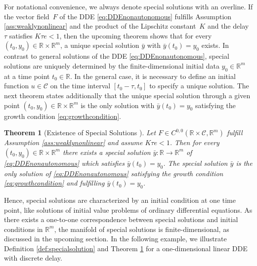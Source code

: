 \documentclass[10pt]{article}
\numberwithin{equation}{section}
\newtheorem{theorem}{Theorem}[section]
\begin{document}
	For notational convenience, we always denote special solutions with an overline. If the vector field~$F$ of the DDE \eqref{eq:DDEnonautonomous} fulfills Assumption \ref{ass:weaklynonlinear} and the product of the Lipschitz constant~$K$ and the delay $\tau$ satisfies $K\tau e < 1$, then the upcoming theorem shows that for every $(t_0,y_0)\in\mathbb{R}\times \mathbb{R}^m$, a unique special solution $\bar{y}$ with $\bar{y}(t_0) = y_0$ exists. In contrast to general solutions of the DDE \eqref{eq:DDEnonautonomous}, special solutions are uniquely determined by the finite-dimensional initial data $y_0 \in \mathbb{R}^m$ at a time point $t_0 \in \mathbb{R}$. In the general case, it is necessary to define an initial function $u\in \mathcal{C}$ on the time interval $[t_0-\tau,t_0]$ to specify a unique solution. The next theorem states additionally that the unique special solution through a given point $(t_0,y_0)\in\mathbb{R}\times \mathbb{R}^m$ is the only solution with $\bar{y}(t_0) = y_0$ satisfying the growth condition \eqref{eq:growthcondition}.
	
	
	\begin{theorem}[Existence of Special Solutions \cite{Driver1968}]\label{th:specialsolutions_uniqueness} 
		Let  $F\in C^{0,0}(\mathbb{R}\times \mathcal{C}, \mathbb{R}^m)$ fulfill Assumption \ref{ass:weaklynonlinear} and assume $K \tau e < 1$. Then for every $(t_0,y_0)\in\mathbb{R}\times \mathbb{R}^m$ there exists a special solution $\bar{y}:\mathbb{R}\rightarrow \mathbb{R}^m$ of \eqref{eq:DDEnonautonomous} which satisfies $\bar{y}(t_0) = y_0$. The special solution $\bar{y}$ is the only solution of \eqref{eq:DDEnonautonomous} satisfying the growth condition \eqref{eq:growthcondition} and fulfilling $\bar{y}(t_0) = y_0$.
	\end{theorem}
	
	Hence, special solutions are characterized by an initial condition at one time point, like solutions of initial value problems of ordinary differential equations. As there exists a one-to-one correspondence between special solutions and initial conditions in $\mathbb{R}^m$, the manifold of special solutions is finite-dimensional, as discussed in the upcoming section. In the following example, we illustrate Definition \ref{def:specialsolution} and Theorem  \ref{th:specialsolutions_uniqueness} for a one-dimensional linear DDE with discrete delay.
	
\end{document}
